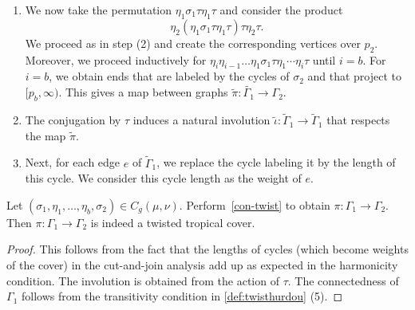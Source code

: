 \begin{construction}
\begin{enumerate}
\begin{enumerate}
\begin{figure}[H]
{}
        \end{figure}

    \end{enumerate}
    In each case, we further extend all ends not attached to a vertex over $p_1$ to~$[p_1,p_2]$.
    \item We now take the permutation $\eta_1\sigma_1\tau\eta_1\tau$ and consider the product
    \begin{equation*}
        \eta_2(\eta_1\sigma_1\tau\eta_1\tau)\tau\eta_2\tau.
    \end{equation*}
    We proceed as in step (2) and create the corresponding vertices over $p_2$. Moreover, we proceed inductively for $\eta_i\eta_{i-1}\dots\eta_1\sigma_1\tau\eta_1\cdots\eta_i\tau$ until $i=b$. For $i=b$, we obtain ends that are labeled by the cycles of $\sigma_2$ and that project to $[p_b,\infty)$. This gives a map between graphs $\tilde{\pi}\colon\tilde{\Gamma_1}\to\Gamma_2$.
    \item The conjugation by $\tau$ induces a natural involution $
    \tilde{\iota}\colon\tilde{\Gamma}_1\to\tilde{\Gamma}_1$ that respects the map $\tilde{\pi}$.
    \item Next, for each edge $e$ of $\tilde{\Gamma}_1$, we replace the cycle labeling it by the length of this cycle. We consider this cycle length as the weight of $e$. 
\end{enumerate}
\end{construction}

\begin{lemma}\label{lem-outcomeconstruction}
Let $(\sigma_1,
\eta_1,\dots,\eta_b,\sigma_2)\in C_g(\mu,\nu)$. Perform~\cref{con-twist} to obtain $\pi\colon\Gamma_1\to\Gamma_2$. Then $\pi\colon\Gamma_1\to\Gamma_2$ is indeed a twisted tropical cover.
    \end{lemma}

\begin{proof}
    This follows from the fact that the lengths of cycles (which become weights of the cover) in the cut-and-join analysis add up as expected in the harmonicity condition. The involution is obtained from the action of $\tau$. The connectedness of $\Gamma_1$ follows from the transitivity condition in \cref{def:twisthurdou} (5).
\end{proof}

